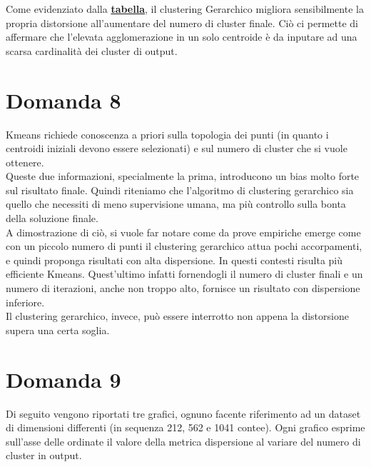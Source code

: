 \documentclass{article}
\begin{document}
\noindent Come evidenziato dalla \hyperlink{fig:test}{\textbf{tabella}}, il clustering Gerarchico migliora sensibilmente la propria distorsione all'aumentare del numero di cluster finale.
Ciò ci permette di affermare che l'elevata agglomerazione in un solo centroide è da inputare ad una scarsa cardinalità dei cluster di output.


\section*{Domanda 8}
Kmeans richiede conoscenza a priori sulla topologia dei punti (in quanto i centroidi iniziali devono essere selezionati) e sul numero di cluster che si vuole ottenere.\\
Queste due informazioni, specialmente la prima, introducono un bias molto forte sul risultato finale.
Quindi riteniamo che l'algoritmo di clustering gerarchico sia quello che necessiti di meno supervisione umana, ma più controllo sulla bonta della soluzione finale.\\
A dimostrazione di ciò, si vuole far notare come da prove empiriche emerge come con un piccolo numero di punti il clustering gerarchico attua pochi accorpamenti, e quindi proponga risultati con alta dispersione. In questi contesti risulta più efficiente Kmeans. Quest'ultimo infatti fornendogli il numero di cluster finali e un numero di iterazioni, anche non troppo alto, fornisce un risultato con dispersione inferiore. \\ 
Il clustering gerarchico, invece, può essere interrotto non appena la distorsione supera una certa soglia.

\section*{Domanda 9}
Di seguito vengono riportati tre grafici, ognuno facente riferimento ad un dataset di dimensioni differenti (in sequenza 212, 562 e 1041 contee). 
Ogni grafico esprime sull'asse delle ordinate il valore della metrica dispersione al variare del numero di cluster in output.\\
\end{document}
